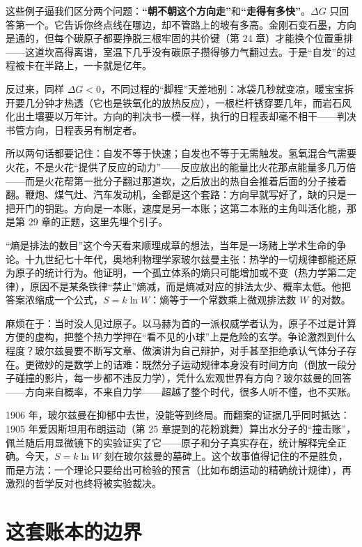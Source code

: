 这些例子逼我们区分两个问题：\textbf{“朝不朝这个方向走”}和\textbf{“走得有多快”}。$\Delta G$ 只回答第一个。它告诉你终点线在哪边，却不管路上的坡有多高。金刚石变石墨，方向是通的，但每个碳原子都要挣脱三根牢固的共价键（第 24 章）才能换个位置重排——这道坎高得离谱，室温下几乎没有碳原子攒得够力气翻过去。于是“自发”的过程被卡在半路上，一卡就是亿年。

反过来，同样 $\Delta G<0$，不同过程的“脚程”天差地别：冰袋几秒就变凉，暖宝宝拆开要几分钟才热透（它也是铁氧化的放热反应），一根栏杆锈穿要几年，而岩石风化出土壤要以万年计。方向的判决书一模一样，执行的日程表却毫不相干——判决书管方向，日程表另有制定者。

所以两句话都要记住：自发不等于快速；自发也不等于无需触发。氢氧混合气需要火花，不是火花“提供了反应的动力”——反应放出的能量比火花那点能量多几万倍——而是火花帮第一批分子翻过那道坎，之后放出的热自会推着后面的分子接着翻。鞭炮、煤气灶、汽车发动机，全都是这个套路：方向早就写好了，缺的只是一把开门的钥匙。方向是一本账，速度是另一本账；这第二本账的主角叫活化能，那是第 29 章的正题，这里先埋个引子。

\begin{zhengju}
“熵是排法的数目”这个今天看来顺理成章的想法，当年是一场赌上学术生命的争论。十九世纪七十年代，奥地利物理学家玻尔兹曼主张：热学的一切规律都能还原为原子的统计行为。他证明，一个孤立体系的熵只可能增加或不变（热力学第二定律），原因不是某条铁律“禁止”熵减，而是熵减对应的排法太少、概率太低。他把答案浓缩成一个公式，$S=k\ln W$：熵等于一个常数乘上微观排法数 $W$ 的对数。

麻烦在于：当时没人见过原子。以马赫为首的一派权威学者认为，原子不过是计算方便的虚构，把整个热力学押在“看不见的小球”上是危险的玄学。争论激烈到什么程度？玻尔兹曼要不断写文章、做演讲为自己辩护，对手甚至拒绝承认气体分子存在。更微妙的是数学上的诘难：既然分子运动规律本身没有时间方向（倒放一段分子碰撞的影片，每一步都不违反力学），凭什么宏观世界有方向？玻尔兹曼的回答——方向来自概率，不来自力学——超越了整个时代，很多人听不懂，也不买账。

1906 年，玻尔兹曼在抑郁中去世，没能等到终局。而翻案的证据几乎同时抵达：1905 年爱因斯坦用布朗运动（第 25 章提到的花粉跳舞）算出水分子的“撞击账”，佩兰随后用显微镜下的实验证实了它——原子和分子真实存在，统计解释完全正确。今天，$S=k\ln W$ 刻在玻尔兹曼的墓碑上。这个故事值得记住的不是胜负，而是方法：一个理论只要给出可检验的预言（比如布朗运动的精确统计规律），再激烈的哲学反对也终将被实验裁决。
\end{zhengju}

\section{这套账本的边界}


